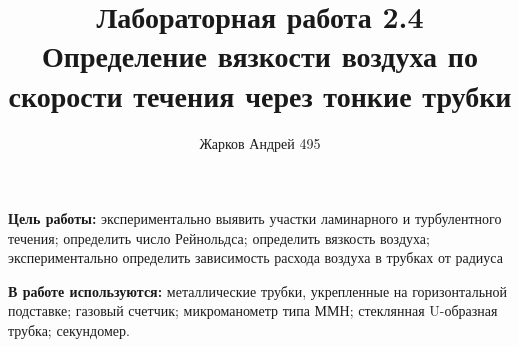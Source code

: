 \documentclass[12pt]{article}
\begin{document}
    \author {Жарков Андрей 495}
    \title {Лабораторная работа 2.4 \\  Определение вязкости воздуха
    	по скорости течения через тонкие трубки}
    \maketitle{}
    
    \textbf{Цель работы:} экспериментально выявить участки ламинарного и турбулентного течения; определить число Рейнольдса; определить вязкость воздуха; экспериментально определить зависимость расхода воздуха в трубках от радиуса
    
    
    \textbf{В работе используются:} металлические трубки, укрепленные
    на горизонтальной подставке; газовый счетчик; микроманометр
    типа ММН; стеклянная U-образная трубка; секундомер.
    
\end{document}
